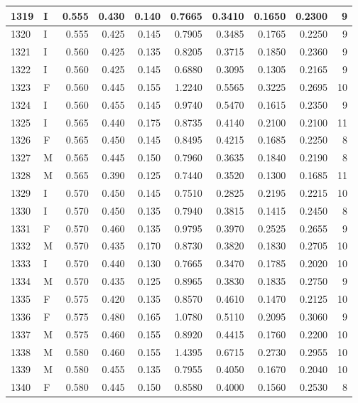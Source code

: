 \documentclass[9pt,twocolumn,twoside,]{pnas-new}
\begin{document}
\begin{tabular}{l|l|r|r|r|r|r|r|r|r}
\hline
1319 & I & 0.555 & 0.430 & 0.140 & 0.7665 & 0.3410 & 0.1650 & 0.2300 & 9\\
\hline
1320 & I & 0.555 & 0.425 & 0.145 & 0.7905 & 0.3485 & 0.1765 & 0.2250 & 9\\
\hline
1321 & I & 0.560 & 0.425 & 0.135 & 0.8205 & 0.3715 & 0.1850 & 0.2360 & 9\\
\hline
1322 & I & 0.560 & 0.425 & 0.145 & 0.6880 & 0.3095 & 0.1305 & 0.2165 & 9\\
\hline
1323 & F & 0.560 & 0.445 & 0.155 & 1.2240 & 0.5565 & 0.3225 & 0.2695 & 10\\
\hline
1324 & I & 0.560 & 0.455 & 0.145 & 0.9740 & 0.5470 & 0.1615 & 0.2350 & 9\\
\hline
1325 & I & 0.565 & 0.440 & 0.175 & 0.8735 & 0.4140 & 0.2100 & 0.2100 & 11\\
\hline
1326 & F & 0.565 & 0.450 & 0.145 & 0.8495 & 0.4215 & 0.1685 & 0.2250 & 8\\
\hline
1327 & M & 0.565 & 0.445 & 0.150 & 0.7960 & 0.3635 & 0.1840 & 0.2190 & 8\\
\hline
1328 & M & 0.565 & 0.390 & 0.125 & 0.7440 & 0.3520 & 0.1300 & 0.1685 & 11\\
\hline
1329 & I & 0.570 & 0.450 & 0.145 & 0.7510 & 0.2825 & 0.2195 & 0.2215 & 10\\
\hline
1330 & I & 0.570 & 0.450 & 0.135 & 0.7940 & 0.3815 & 0.1415 & 0.2450 & 8\\
\hline
1331 & F & 0.570 & 0.460 & 0.135 & 0.9795 & 0.3970 & 0.2525 & 0.2655 & 9\\
\hline
1332 & M & 0.570 & 0.435 & 0.170 & 0.8730 & 0.3820 & 0.1830 & 0.2705 & 10\\
\hline
1333 & I & 0.570 & 0.440 & 0.130 & 0.7665 & 0.3470 & 0.1785 & 0.2020 & 10\\
\hline
1334 & M & 0.570 & 0.435 & 0.125 & 0.8965 & 0.3830 & 0.1835 & 0.2750 & 9\\
\hline
1335 & F & 0.575 & 0.420 & 0.135 & 0.8570 & 0.4610 & 0.1470 & 0.2125 & 10\\
\hline
1336 & F & 0.575 & 0.480 & 0.165 & 1.0780 & 0.5110 & 0.2095 & 0.3060 & 9\\
\hline
1337 & M & 0.575 & 0.460 & 0.155 & 0.8920 & 0.4415 & 0.1760 & 0.2200 & 10\\
\hline
1338 & M & 0.580 & 0.460 & 0.155 & 1.4395 & 0.6715 & 0.2730 & 0.2955 & 10\\
\hline
1339 & M & 0.580 & 0.455 & 0.135 & 0.7955 & 0.4050 & 0.1670 & 0.2040 & 10\\
\hline
1340 & F & 0.580 & 0.445 & 0.150 & 0.8580 & 0.4000 & 0.1560 & 0.2530 & 8\\

\end{tabular}
\end{document}

